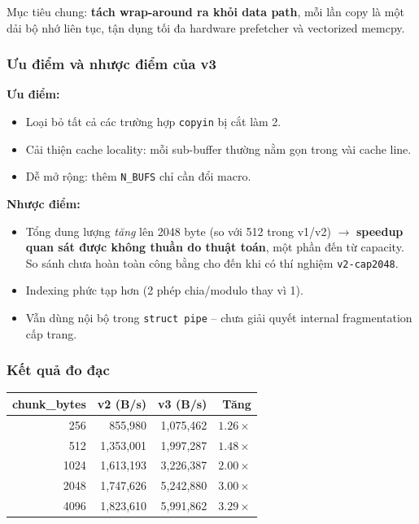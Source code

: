 \documentclass[11pt,a4paper]{article}
\begin{document}
Mục tiêu chung: \textbf{tách wrap-around ra khỏi data path}, mỗi lần copy là một dải bộ nhớ liên tục, tận dụng tối đa hardware prefetcher và vectorized memcpy.

\subsubsection{Ưu điểm và nhược điểm của v3}

\textbf{Ưu điểm:}
\begin{itemize}
  \item Loại bỏ tất cả các trường hợp \texttt{copyin} bị cắt làm 2.
  \item Cải thiện cache locality: mỗi sub-buffer thường nằm gọn trong vài cache line.
  \item Dễ mở rộng: thêm \texttt{N\_BUFS} chỉ cần đổi macro.
\end{itemize}

\textbf{Nhược điểm:}
\begin{itemize}
  \item Tổng dung lượng \emph{tăng} lên 2048 byte (so với 512 trong v1/v2) $\rightarrow$ \textbf{speedup quan sát được không thuần do thuật toán}, một phần đến từ capacity. So sánh chưa hoàn toàn công bằng cho đến khi có thí nghiệm \texttt{v2-cap2048}.
  \item Indexing phức tạp hơn (2 phép chia/modulo thay vì 1).
  \item Vẫn dùng nội bộ trong \texttt{struct pipe} -- chưa giải quyết internal fragmentation cấp trang.
\end{itemize}

\subsubsection{Kết quả đo đạc}

\begin{center}
\begin{tabular}{rrrr}
\toprule
\textbf{chunk\_bytes} & \textbf{v2 (B/s)} & \textbf{v3 (B/s)} & \textbf{Tăng} \\
\midrule
256   & 855{,}980     & 1{,}075{,}462 & $1.26\times$ \\
512   & 1{,}353{,}001 & 1{,}997{,}287 & $1.48\times$ \\
1024  & 1{,}613{,}193 & 3{,}226{,}387 & $2.00\times$ \\
2048  & 1{,}747{,}626 & 5{,}242{,}880 & $3.00\times$ \\
4096  & 1{,}823{,}610 & 5{,}991{,}862 & $3.29\times$ \\
\bottomrule
\end{tabular}
\end{center}
\end{document}
